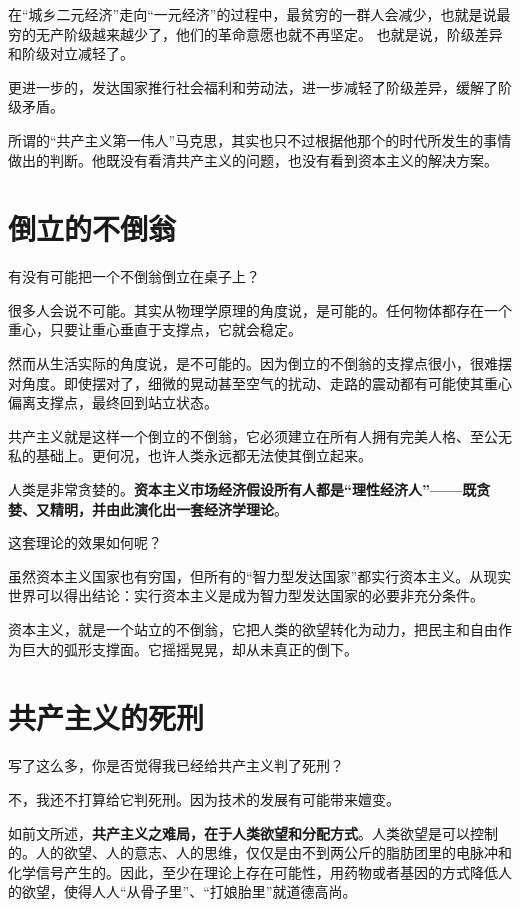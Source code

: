在“城乡二元经济”走向“一元经济”的过程中，最贫穷的一群人会减少，也就是说最穷的无产阶级越来越少了，他们的革命意愿也就不再坚定。
也就是说，阶级差异和阶级对立减轻了。

更进一步的，发达国家推行社会福利和劳动法，进一步减轻了阶级差异，缓解了阶级矛盾。

所谓的“共产主义第一伟人”马克思，其实也只不过根据他那个的时代所发生的事情做出的判断。他既没有看清共产主义的问题，也没有看到资本主义的解决方案。

\section{倒立的不倒翁}
有没有可能把一个不倒翁倒立在桌子上？

很多人会说不可能。其实从物理学原理的角度说，是可能的。任何物体都存在一个重心，只要让重心垂直于支撑点，它就会稳定。

然而从生活实际的角度说，是不可能的。因为倒立的不倒翁的支撑点很小，很难摆对角度。即使摆对了，细微的晃动甚至空气的扰动、走路的震动都有可能使其重心偏离支撑点，最终回到站立状态。

共产主义就是这样一个倒立的不倒翁，它必须建立在所有人拥有完美人格、至公无私的基础上。更何况，也许人类永远都无法使其倒立起来。

\zPar

人类是非常贪婪的。\textbf{资本主义市场经济假设所有人都是“理性经济人”——既贪婪、又精明，并由此演化出一套经济学理论}。

这套理论的效果如何呢？

虽然资本主义国家也有穷国，但所有的“智力型发达国家”都实行资本主义。从现实世界可以得出结论：实行资本主义是成为智力型发达国家的必要非充分条件。

资本主义，就是一个站立的不倒翁，它把人类的欲望转化为动力，把民主和自由作为巨大的弧形支撑面。它摇摇晃晃，却从未真正的倒下。

\section{共产主义的死刑}
写了这么多，你是否觉得我已经给共产主义判了死刑？

不，我还不打算给它判死刑。因为技术的发展有可能带来嬗变。

\zPar

如前文所述，\textbf{共产主义之难局，在于人类欲望和分配方式}。人类欲望是可以控制的。人的欲望、人的意志、人的思维，仅仅是由不到两公斤的脂肪团里的电脉冲和化学信号产生的。因此，至少在理论上存在可能性，用药物或者基因的方式降低人的欲望，使得人人“从骨子里”、“打娘胎里”就道德高尚。

